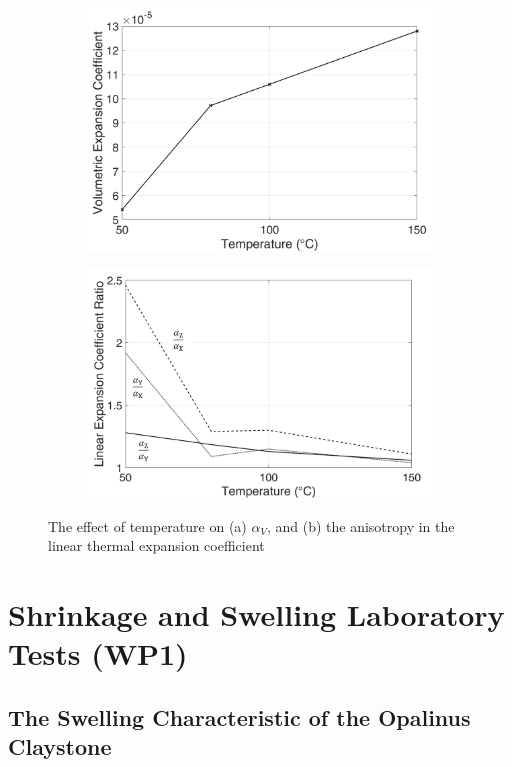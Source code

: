 \begin{figure}[!ht]
\centering
\begin{subfigure}[b]{0.45\textwidth}
\includegraphics[width=0.5\linewidth]{figures/Amir_TrueTriaxial_MT_02_Result_1a.png}
\subcaption{}
\label{fig:Amir_TrueTriaxial_MT_02_Result_1a}
\end{subfigure}
\begin{subfigure}[b]{0.45\textwidth}
\includegraphics[width=0.5\linewidth]{figures/Amir_TrueTriaxial_MT_02_Result_1b.png}
\subcaption{}
\label{fig:Amir_TrueTriaxial_MT_02_Result_1b}
\end{subfigure}
\caption{The effect of temperature on (a) $\alpha_V$, and (b) the anisotropy in the linear thermal expansion coefficient}
\end{figure}



\section{Shrinkage and Swelling Laboratory Tests (WP1)}

\subsection{The Swelling Characteristic of the Opalinus Claystone}

